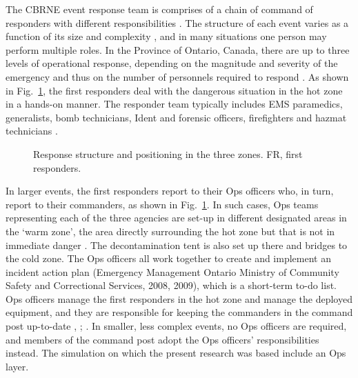 \documentclass[link]{IWCOMP}
\begin{document}
The CBRNE event response team is comprises of a chain of command of
responders with different responsibilities \citep{bib12}. The
structure of each event varies as a function of its size and complexity
\citep{bib28}, and in many situations one person may perform multiple
roles. In the Province of Ontario, Canada, there are up to three levels of
operational response, depending on the magnitude and severity of the
emergency and thus on the number of personnels required to respond
\citep{bib7}. As shown in Fig.~\ref{fig1}, the first responders deal with the
dangerous situation in the hot zone in a hands-on manner. The responder team
typically includes EMS paramedics, generalists, bomb technicians, Ident and
forensic officers, firefighters and hazmat technicians \citep{bib38}.

\begin{figure}[]
\centerline{}
\caption{Response structure and positioning in the three zones.
FR, first responders.\label{fig1}}
\end{figure}

 In larger events, the first responders report to their Ops officers who, in
turn, report to their commanders, as shown in Fig.~\ref{fig1}. In such cases, Ops
teams representing each of the three agencies are set-up in different
designated areas in the `warm zone', the area directly surrounding the hot
zone but that is not in immediate danger \citep{bib12}. The
decontamination tent is also set up there and bridges to the cold zone. The
Ops officers all work together to create and implement an incident action
plan (Emergency Management Ontario Ministry of Community Safety and
Correctional Services, 2008, 2009), which is a short-term to-do list. Ops
officers manage the first responders in the hot zone and manage the deployed
equipment, and they are responsible for keeping the commanders in the
command post up-to-date \citet{bib7}, \citet{bib8}; \citep{bib24}. In smaller, less
complex events, no Ops officers are required, and members of the command
post adopt the Ops officers' responsibilities instead. The simulation on
which the present research was based include an Ops layer.
\end{document}
